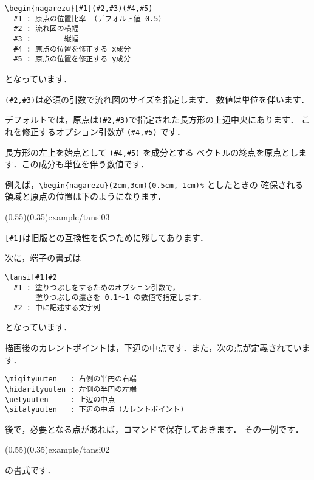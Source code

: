 \documentclass[a4j]{jarticle}
\makeatletter
\newcommand{\cindex}[1]{\index{#1@\texttt{\protect\cmd{#1}}}}
\makeatother
\begin{document}
\begin{boxnote}
\begin{verbatim}
\begin{nagarezu}[#1](#2,#3)(#4,#5)
  #1 : 原点の位置比率 （デフォルト値 0.5）
  #2 : 流れ図の横幅
  #3 : 　　　　縦幅
  #4 : 原点の位置を修正する x成分
  #5 : 原点の位置を修正する y成分
\end{verbatim}
\end{boxnote}

となっています．

\verb/(#2,#3)/は必須の引数で流れ図のサイズを指定します．
数値は単位を伴います．

デフォルトでは，原点は\verb/(#2,#3)/で指定された長方形の上辺中央にあります．
これを修正するオプション引数が \verb/(#4,#5)/ です．

長方形の左上を始点として \verb/(#4,#5)/ を成分とする
ベクトルの終点を原点とします．この成分も単位を伴う数値です．

例えば，\verb/\begin{nagarezu}(2cm,3cm)(0.5cm,-1cm)%/ としたときの
確保される領域と原点の位置は下のようになります．

(0.55)(0.35){example/tansi03}

\verb/[#1]/は旧版との互換性を保つために残してあります．

次に，端子の書式は

\begin{boxnote}
\begin{verbatim}
\tansi[#1]#2
  #1 : 塗りつぶしをするためのオプション引数で，
       塗りつぶしの濃さを 0.1〜1 の数値で指定します．
  #2 : 中に記述する文字列
\end{verbatim}
\end{boxnote}

となっています．

描画後のカレントポイントは，下辺の中点です．また，次の点が定義されています．
\begin{jquote}
\begin{verbatim}
\migityuuten   : 右側の半円の右端
\hidarityuuten : 左側の半円の左端
\uetyuuten     : 上辺の中点
\sitatyuuten   : 下辺の中点（カレントポイント)
\end{verbatim}
\end{jquote}
後で，必要となる点があれば，コマンドで保存しておきます．
その一例です．

(0.55)(0.35){example/tansi02}

 の書式です．\cindex{nahuda}
\end{document}
